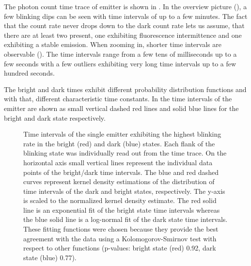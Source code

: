 		The photon count time trace of emitter \emnarrow is shown in .
		In the overview picture (), a few blinking dips can be seen with time intervals of up to a few minutes.
		The fact that the count rate never drops down to the dark count rate lets us assume, that there are at least two \sivs present, one exhibiting fluorescence intermittence and one exhibiting a stable emission.
		When zooming in, shorter time intervals are observable ().
		The time intervals range from a few tens of milliseconds up to a few seconds with a few outliers exhibiting very long time intervals up to a few hundred seconds.
		
		The bright and dark times exhibit different probability distribution functions and with that, different characteristic time constants.
		In  the time intervals of the emitter are shown as small vertical dashed red lines and solid blue lines for the bright and dark state respectively.

		\begin{figure}[!htb]
			\centering
			\caption[Distributions of bright and dark state intervals]{Time intervals of the single emitter exhibiting the highest blinking rate in the bright (red) and dark (blue) states. Each flank of the blinking state was individually read out from the \pl time trace. On the horizontal axis small vertical lines represent the individual data points of the bright/dark time intervals. The blue and red dashed curves represent kernel density estimations of the distribution of time intervals of the dark and bright states, respectively. The y-axis is scaled to the normalized kernel density estimate. The red solid line is an exponential fit of the bright state time intervals whereas the blue solid line is a log-normal fit of the dark state time intervals. These fitting functions were chosen because they provide the best agreement with the data using a Kolomogorov-Smirnov test with respect to other functions (p-values: bright state (red) 0.92, dark state (blue) 0.77).}
			\label{fig::fit_blink_distr}
		\end{figure}

